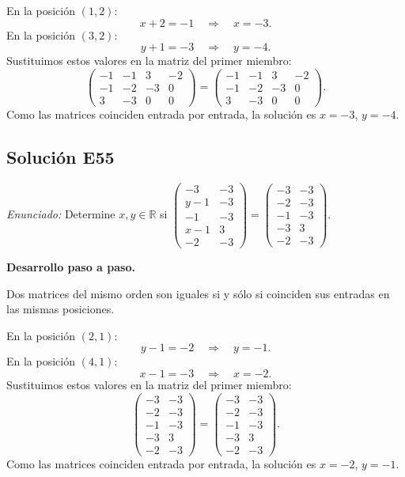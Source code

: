 \documentclass[12pt]{article}
\theoremstyle{remark}
\newcommand{\solucion}[2]{\Needspace{11\baselineskip}\subsection*{Solución E#1}\noindent\textit{Enunciado:} #2\par\medskip\noindent\textbf{Desarrollo paso a paso.}\par\medskip}
\begin{document}
En la posición $(1,2)$:
\[
x + 2=-1\quad\Longrightarrow\quad x=-3.
\]
En la posición $(3,2)$:
\[
y + 1=-3\quad\Longrightarrow\quad y=-4.
\]
Sustituimos estos valores en la matriz del primer miembro:
\[
\begin{pmatrix}-1&-1&3&-2\\-1&-2&-3&0\\3&-3&0&0\end{pmatrix}=\begin{pmatrix}-1&-1&3&-2\\-1&-2&-3&0\\3&-3&0&0\end{pmatrix}.
\]
Como las matrices coinciden entrada por entrada, la solución es $x=-3$, $y=-4$.


\medskip

\solucion{55}{Determine $x,y\in\mathbb R$ si $\begin{pmatrix}-3&-3\\y - 1&-3\\-1&-3\\x - 1&3\\-2&-3\end{pmatrix}=\begin{pmatrix}-3&-3\\-2&-3\\-1&-3\\-3&3\\-2&-3\end{pmatrix}$.}
Dos matrices del mismo orden son iguales si y sólo si coinciden sus entradas en las mismas posiciones.

En la posición $(2,1)$:
\[
y - 1=-2\quad\Longrightarrow\quad y=-1.
\]
En la posición $(4,1)$:
\[
x - 1=-3\quad\Longrightarrow\quad x=-2.
\]
Sustituimos estos valores en la matriz del primer miembro:
\[
\begin{pmatrix}-3&-3\\-2&-3\\-1&-3\\-3&3\\-2&-3\end{pmatrix}=\begin{pmatrix}-3&-3\\-2&-3\\-1&-3\\-3&3\\-2&-3\end{pmatrix}.
\]
Como las matrices coinciden entrada por entrada, la solución es $x=-2$, $y=-1$.


\medskip
\end{document}
